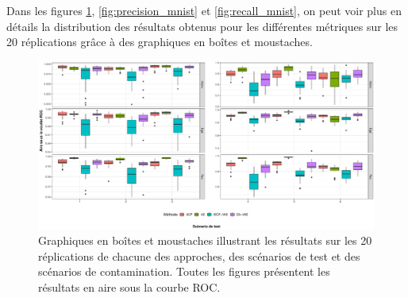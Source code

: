 Dans les figures \ref{fig:auc_mnist}, \ref{fig:precision_mnist} et \ref{fig:recall_mnist}, on peut voir plus en détails la distribution des résultats obtenus pour les \DIFdelbegin {}\DIFdelend \DIFaddbegin {}\DIFaddend différentes métriques sur les 20 réplications grâce à des graphiques en boîtes et moustaches.

\begin{figure}[H]
	\centering
	\includegraphics[width=\linewidth]{images/images_boxplots/auc_mnist.pdf}
	\caption{Graphiques en boîtes et moustaches illustrant les résultats sur les 20 réplications de chacune des approches, des scénarios de test et des scénarios de contamination. Toutes les figures présentent les résultats en aire sous la courbe ROC.}
	\label{fig:auc_mnist}
\end{figure}

